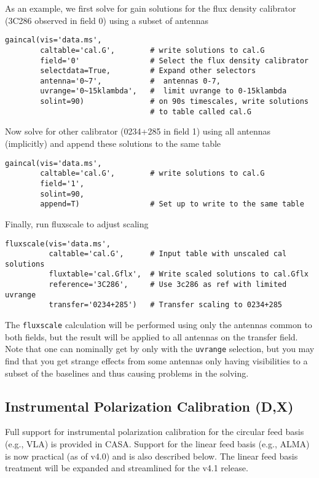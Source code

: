 As an example, we first solve for gain solutions for the flux density
calibrator (3C286 observed in field 0) using a subset of antennas
\small
\begin{verbatim}
gaincal(vis='data.ms',
        caltable='cal.G',        # write solutions to cal.G
        field='0'                # Select the flux density calibrator
        selectdata=True,         # Expand other selectors
        antenna='0~7',           #  antennas 0-7,
        uvrange='0~15klambda',   #  limit uvrange to 0-15klambda
        solint=90)               # on 90s timescales, write solutions
                                 # to table called cal.G
\end{verbatim}
\normalsize
Now solve for other calibrator (0234+285 in field 1) using all antennas
(implicitly) and append these solutions to the same table
\small
\begin{verbatim}
gaincal(vis='data.ms',
        caltable='cal.G',        # write solutions to cal.G
        field='1',
        solint=90,
        append=T)                # Set up to write to the same table
\end{verbatim}
\normalsize
Finally, run fluxscale to adjust scaling
\small
\begin{verbatim}
fluxscale(vis='data.ms',
          caltable='cal.G',      # Input table with unscaled cal solutions
          fluxtable='cal.Gflx',  # Write scaled solutions to cal.Gflx
          reference='3C286',     # Use 3c286 as ref with limited uvrange
          transfer='0234+285')   # Transfer scaling to 0234+285
\end{verbatim}
\normalsize

The {\tt fluxscale} calculation will be performed using only the
antennas common 
to both fields, but the result will be applied to all antennas on the
transfer field.  Note that one can nominally get by only with the
{\tt uvrange} selection, but you may find that you get strange
effects from some antennas only having visibilities to a subset of
the baselines and thus causing problems in the solving.

\subsection{Instrumental Polarization Calibration (D,X)}
\label{section:cal.solve.pol}

Full support for instrumental polarization calibration for the 
circular feed basis (e.g., VLA) is provided in CASA.  Support for 
the linear feed basis (e.g., ALMA) is now practical (as of v4.0)
and is also described below.  The linear feed basis treatment
will be expanded and streamlined for the v4.1 release.


